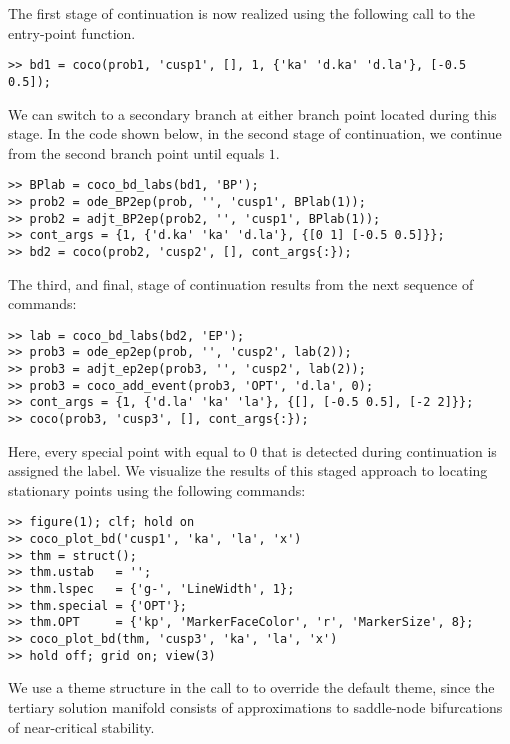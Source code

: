 The first stage of continuation is now realized using the following call to the  entry-point function.
\begin{lstlisting}[language=coco-highlight]
>> bd1 = coco(prob1, 'cusp1', [], 1, {'ka' 'd.ka' 'd.la'}, [-0.5 0.5]);
\end{lstlisting}
We can switch to a secondary branch at either branch point located during this stage. In the code shown below, in the second stage of continuation, we continue from the second branch point until  equals $1$.
\begin{lstlisting}[language=coco-highlight]
>> BPlab = coco_bd_labs(bd1, 'BP');
>> prob2 = ode_BP2ep(prob, '', 'cusp1', BPlab(1));
>> prob2 = adjt_BP2ep(prob2, '', 'cusp1', BPlab(1));
>> cont_args = {1, {'d.ka' 'ka' 'd.la'}, {[0 1] [-0.5 0.5]}};
>> bd2 = coco(prob2, 'cusp2', [], cont_args{:});
\end{lstlisting}
The third, and final, stage of continuation results from the next sequence of commands:
\begin{lstlisting}[language=coco-highlight]
>> lab = coco_bd_labs(bd2, 'EP');
>> prob3 = ode_ep2ep(prob, '', 'cusp2', lab(2));
>> prob3 = adjt_ep2ep(prob3, '', 'cusp2', lab(2));
>> prob3 = coco_add_event(prob3, 'OPT', 'd.la', 0);
>> cont_args = {1, {'d.la' 'ka' 'la'}, {[], [-0.5 0.5], [-2 2]}};
>> coco(prob3, 'cusp3', [], cont_args{:});
\end{lstlisting}
Here, every special point with  equal to $0$ that is detected during continuation is assigned the  label. We visualize the results of this staged approach to locating stationary points using the following commands:
\begin{lstlisting}[language=coco-highlight]
>> figure(1); clf; hold on
>> coco_plot_bd('cusp1', 'ka', 'la', 'x')
>> thm = struct();
>> thm.ustab   = '';
>> thm.lspec   = {'g-', 'LineWidth', 1};
>> thm.special = {'OPT'};
>> thm.OPT     = {'kp', 'MarkerFaceColor', 'r', 'MarkerSize', 8};
>> coco_plot_bd(thm, 'cusp3', 'ka', 'la', 'x')
>> hold off; grid on; view(3)
\end{lstlisting}
We use a theme structure in the call to  to override the default  theme, since the tertiary solution manifold consists of approximations to saddle-node bifurcations of near-critical stability.\\
\medskip

